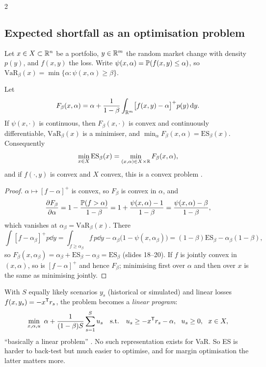 \begin{paracol}{2}
\subsection{Expected shortfall as an optimisation problem}
Let $x\in X\subset\mathbb{R}^n$ be a portfolio, $y\in\mathbb{R}^m$ the random market change with density $p(y)$, and $f(x,y)$ the
loss. Write $\psi(x,\alpha)=\mathbb{P}(f(x,y)\le\alpha)$, so $\mathrm{VaR}_\beta(x)=\min\{\alpha:\psi(x,\alpha)\ge\beta\}$.

\begin{theorem}\label{ch08:thm-ru}
Let
\[
  F_\beta(x,\alpha)=\alpha+\frac{1}{1-\beta}\int_{\mathbb{R}^m}\bigl[f(x,y)-\alpha\bigr]^+p(y)\,\mathrm{d} y .
\]
If $\psi(x,\cdot)$ is continuous, then $F_\beta(x,\cdot)$ is convex and continuously differentiable,
$\mathrm{VaR}_\beta(x)$ is a minimiser, and $\min_\alpha F_\beta(x,\alpha)=\mathrm{ES}_\beta(x)$. Consequently
\[
  \min_{x\in X}\mathrm{ES}_\beta(x)=\min_{(x,\alpha)\in X\times\mathbb{R}}F_\beta(x,\alpha),
\]
and if $f(\cdot,y)$ is convex and $X$ convex, this is a convex problem .
\end{theorem}
\begin{proof}
$\alpha\mapsto[f-\alpha]^+$ is convex, so $F_\beta$ is convex in $\alpha$, and
\[
  \frac{\partial F_\beta}{\partial\alpha}=1-\frac{\mathbb{P}(f>\alpha)}{1-\beta}=1+\frac{\psi(x,\alpha)-1}{1-\beta}
  =\frac{\psi(x,\alpha)-\beta}{1-\beta},
\]
which vanishes at $\alpha_\beta=\mathrm{VaR}_\beta(x)$. There
\[
  \int[f-\alpha_\beta]^+p\dd y=\int_{f\ge\alpha_\beta}f\,p\dd y-\alpha_\beta\bigl(1-\psi(x,\alpha_\beta)\bigr)
  =(1-\beta)\mathrm{ES}_\beta-\alpha_\beta(1-\beta),
\]
so $F_\beta(x,\alpha_\beta)=\alpha_\beta+\mathrm{ES}_\beta-\alpha_\beta=\mathrm{ES}_\beta$ (slides 18--20). If $f$ is jointly
convex in $(x,\alpha)$, so is $[f-\alpha]^+$ and hence $F_\beta$; minimising first over $\alpha$ and then over $x$ is
the same as minimising jointly.
\end{proof}
With $S$ equally likely scenarios $y_s$ (historical or simulated) and linear losses $f(x,y_s)=-x^{\mathsf T} r_s$, the problem
becomes a \emph{linear program}:
\[
  \min_{x,\alpha,u}\ \alpha+\frac{1}{(1-\beta)S}\sum_{s=1}^Su_s\quad\text{s.t.}\quad u_s\ge -x\T r_s-\alpha,\ \ u_s\ge0,
  \ \ x\in X ,
\]
``basically a linear problem'' . No such representation exists for VaR. So ES is harder to
back-test but much easier to optimise, and for margin optimisation the latter matters more.


\end{paracol}
